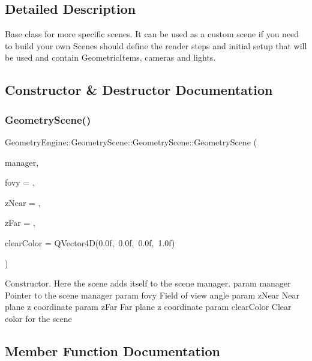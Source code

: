 \subsection{Detailed Description}
Base class for more specific scenes. It can be used as a custom scene if you need to build your own Scenes should define the render steps and initial setup that will be used and contain Geometric\+Items, cameras and lights. 

\subsection{Constructor \& Destructor Documentation}
\mbox{\label{class_geometry_engine_1_1_geometry_scene_1_1_geometry_scene_a238916b6237ec6b280541e48604955ca}} 
\subsubsection{\texorpdfstring{GeometryScene()}{GeometryScene()}}
{\footnotesize\ttfamily Geometry\+Engine\+::\+Geometry\+Scene\+::\+Geometry\+Scene\+::\+Geometry\+Scene (\begin{DoxyParamCaption}\item[{\mbox{\hyperlink{class_geometry_engine_1_1_scene_manager}{Scene\+Manager}} $\ast$}]{manager,  }\item[{G\+Ldouble}]{fovy = {},  }\item[{G\+Ldouble}]{z\+Near = {},  }\item[{G\+Ldouble}]{z\+Far = {},  }\item[{Q\+Vector4D}]{clear\+Color = {\ttfamily QVector4D(0.0f,~0.0f,~0.0f,~1.0f)} }\end{DoxyParamCaption})}

Constructor. Here the scene adds itself to the scene manager. param manager Pointer to the scene manager param fovy Field of view angle param z\+Near Near plane z coordinate param z\+Far Far plane z coordinate param clear\+Color Clear color for the scene 

\subsection{Member Function Documentation}
\mbox{\label{class_geometry_engine_1_1_geometry_scene_1_1_geometry_scene_af93678aaffba19dfb2302a9b2850ae59}} 

